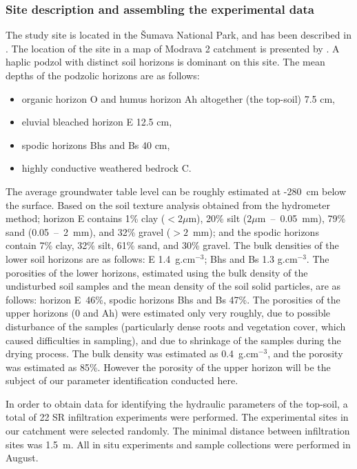 \documentclass[review]{elsarticle}
\begin{document}
\subsubsection{Site description and assembling the experimental data}%
\label{site}
The study site is located in the \v{S}umava National Park, and has been described in \citep{Jacka1}. The location of the site in a map of Modrava 2 catchment is presented by \cite{Jacka2}.
A haplic podzol with distinct soil horizons is dominant on this site. The mean depths of the podzolic horizons are as follows:
\begin{itemize}
\item organic horizon O and humus horizon Ah altogether (the top-soil) 7.5 cm, 
\item eluvial bleached horizon E 12.5 cm, 
\item spodic horizons Bhs and Bs 40 cm,
\item highly conductive weathered bedrock C.
\end{itemize}
The average groundwater table level can be roughly estimated at -280~cm below the surface. 
Based on the soil texture analysis obtained from the hydrometer method; horizon E contains 1\% clay ($<2\mu$m), 20\% silt ($ 2\mu$m~--~0.05~mm), 79\% sand (0.05~--~2~mm), and 32\% gravel  ($>2$~mm); and the spodic horizons contain 7\% clay, 32\% silt, 61\% sand, and 30\% gravel. The bulk densities of the lower soil horizons are as follows:
E 1.4~g.cm$^{-3}$; Bhs and Bs 1.3 g.cm$^{-3}$. The porosities of the lower horizons, estimated using the bulk density of the undisturbed soil samples and the mean density of the soil solid particles, are as follows: horizon E~46\%, spodic horizons Bhs and Bs 47\%. The porosities of the upper horizons (0 and Ah) were estimated only very roughly, due to  possible disturbance of the samples (particularly dense roots and vegetation cover, which caused difficulties in sampling), and due to shrinkage of the samples during the drying process. The bulk density was estimated as  0.4~g.cm$^{-3}$, and the porosity was estimated as 85\%. However the porosity of the upper horizon will be the subject of our parameter identification conducted here. 








In order to obtain data for identifying the hydraulic parameters of the top-soil, a total of 22 SR infiltration experiments were performed. The experimental sites in our catchment were  selected randomly. The minimal distance between infiltration sites was 1.5~m. All in situ experiments and sample collections were performed in August.
\end{document}
